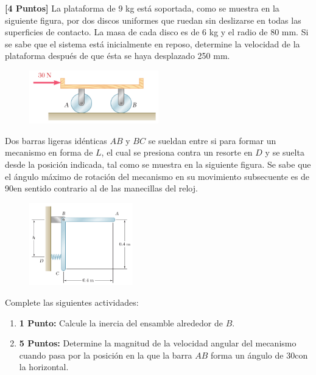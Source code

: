 \documentclass[ a4paper, twoside, 11pt]{article}
\begin{document}
\begin{problem}
\textbf{[4 Puntos]} La plataforma de 9 kg est\'a soportada, como se muestra en la siguiente figura, por dos discos uniformes que ruedan sin deslizarse en todas las superficies de contacto. La masa de cada disco es de 6 kg y el radio de 80 mm. Si se sabe que el sistema est\'a inicialmente en reposo, determine la velocidad de la plataforma despu\'es de que \'esta se haya desplazado 250 mm. 

\begin{figure}[htb]
\centering
\includegraphics[width=0.5\textwidth]{problema-03.jpg}
\end{figure}

\end{problem}
\fullskip

\begin{problem}
Dos barras ligeras id\'enticas $AB$ y $BC$ se sueldan entre si para formar un mecanismo en forma de $L$, el cual se presiona contra un resorte en $D$ y se suelta desde la posici\'on indicada, tal como se muestra en la siguiente figura. Se sabe que el \'angulo m\'aximo de rotaci\'on del mecanismo en su movimiento subsecuente es de 90\deg en sentido contrario al de las manecillas del reloj. 

\begin{figure}[htb]
\centering
\includegraphics[width=0.4\textwidth]{problema-04.jpg}
\end{figure}

Complete las siguientes actividades: 
\begin{enumerate}[label=\textbf{\alph*)}]
\item \textbf{1 Punto:} Calcule la inercia del ensamble alrededor de $B$. 
\item \textbf{5 Puntos:} Determine la magnitud de la velocidad angular del mecanismo cuando pasa por la posici\'on en la que la barra $AB$ forma un \'angulo de 30\deg con la horizontal. 
\end{enumerate}

\end{problem}
\fullskip
\end{document}

